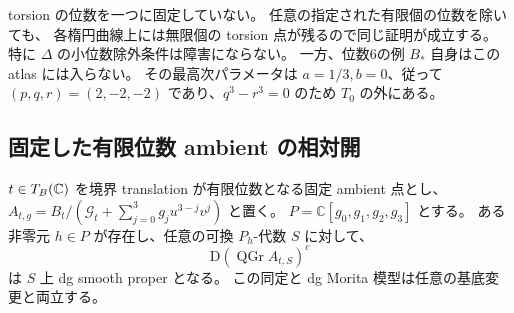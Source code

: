 \begin{remark}
torsion の位数を一つに固定していない。
任意の指定された有限個の位数を除いても、
各楕円曲線上には無限個の torsion 点が残るので同じ証明が成立する。
特に $\Delta$ の小位数除外条件は障害にならない。
一方、位数6の例 $B_*$ 自身はこの atlas には入らない。
その最高次パラメータは $a=1/3,b=0$、従って
$(p,q,r)=(2,-2,-2)$ であり、$q^3-r^3=0$ のため $T_0$ の外にある。
\end{remark}

\subsection{固定した有限位数 ambient の相対開}

\begin{proposition}
\label{prop:seed-fixed-ambient-relative-smooth}
$t\in T_B(\mathbb C)$ を境界 translation が有限位数となる固定 ambient 点とし、
$A_{t,g}=B_t/(\mathcal G_t+\sum_{j=0}^3g_ju^{3-j}v^j)$ と置く。
$P=\mathbb C[g_0,g_1,g_2,g_3]$ とする。
ある非零元 $h\in P$ が存在し、任意の可換 $P_h$-代数 $S$ に対して、
\[
 \mathrm D(\operatorname{QGr}A_{t,S})^c
\]
は $S$ 上 dg smooth proper となる。
この同定と dg Morita 模型は任意の基底変更と両立する。

\end{proposition}

